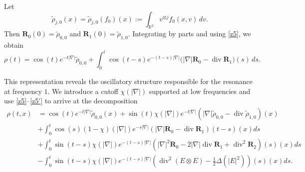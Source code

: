 \documentclass[reqno,11pt]{amsart}
\numberwithin{equation}{section}
\def\R{{\mathbb R}}
\def\R{{\bf R}}
\def\R{\mathbb{R}}
\begin{document}
	Let $$\tilde\rho_{j,0}(x)=\tilde\rho_{j,0}(f_0)(x):=\int_{\R^2} v^{\otimes j}f_0(x,v)\,dv.$$ Then
	$\mathbf{R}_0(0)=\tilde\rho_{0,0}$ and $\mathbf{R}_1(0)=\tilde\rho_{1,0}$.
	Integrating by parts and using \eqref{z5}, we obtain
	\begin{equation}\label{z40.1}
		\rho(t)= \cos(t)e^{-t|\nabla|}\tilde\rho_{0,0}
		+ \int_0^t \cos(t-s)e^{-(t-s)|\nabla|}
		\big(|\nabla|\mathbf{R}_0-\operatorname{div}\mathbf{R}_1\big)(s)\,ds .
	\end{equation}
	
	This representation reveals the oscillatory structure
	responsible for the resonance at frequency $1$. We introduce a cutoff $\chi(|\nabla|)$ supported at low frequencies and use 
	\eqref{z5}–\eqref{z5'} to arrive at the decomposition
	\begin{equation}\label{z40.2}
		\begin{split}
			\rho(t,x)&=\cos(t)e^{-t|\nabla|} \tilde\rho_{0,0}(x)+\sin(t)\chi(|\nabla|)e^{-t|\nabla|} (|\nabla|\tilde\rho_{0,0}-\operatorname{div}\tilde{\rho}_{1,0})(x)\\&+\int_{0}^{t}\cos(s)(1-\chi)(|\nabla|)e^{-s|\nabla|} (|\nabla|\mathbf{R}_0-\operatorname{div}\mathbf{R}_1)(t-s)(x)ds\\&
			+	\int_{0}^{t}\sin(t-s)\chi(|\nabla|)e^{-(t-s)|\nabla|} (|\nabla|^2\mathbf{R}_0-2|\nabla|\operatorname{div}\mathbf{R}_1+\operatorname{div}^2\mathbf{R}_2)(s)(x)ds\\&
			-	\int_{0}^{t}\sin(t-s)\chi(|\nabla|)e^{-(t-s)|\nabla|} (\operatorname{div}^2(E\otimes E)-\frac{1}{2}\Delta(| E|^2))(s)(x)ds.
		\end{split}
	\end{equation}
	
\end{document}
